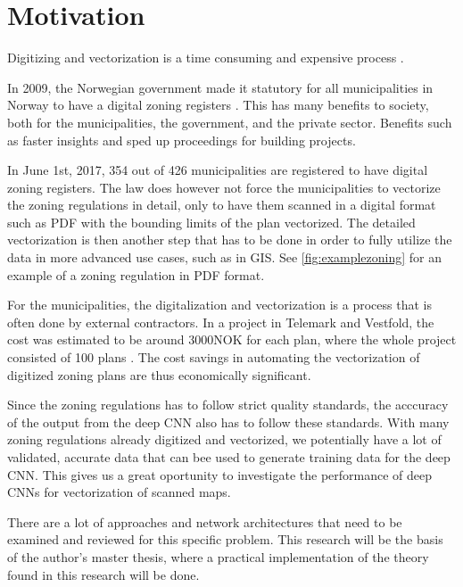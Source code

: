 \chapter{Motivation}\label{chp:motivation }
Digitizing and vectorization is a time consuming and expensive process \cite{Worboys2003}.

In 2009, the Norwegian government made it statutory for all municipalities in Norway to have a digital zoning registers \cite{Kommunaltplanregister2009}. This has many benefits to society, both for the municipalities, the government, and the private sector. Benefits such as faster insights and sped up proceedings for building projects. 

In June 1st, 2017, 354 out of 426 municipalities are registered to have digital zoning registers. The law does however not force the municipalities to vectorize the zoning regulations in detail, only to have them scanned in a digital format such as PDF with the bounding limits of the plan vectorized. The detailed vectorization is then another step that has to be done in order to fully utilize the data in more advanced use cases, such as in GIS. See \autoref{fig:examplezoning} for an example of a zoning regulation in PDF format.

For the municipalities, the digitalization and vectorization is a process that is often done by external contractors. In a project in Telemark and Vestfold, the cost was estimated to be around 3000NOK for each plan, where the whole project consisted of 100 plans \cite{Bo2009}. The cost savings in automating the vectorization of digitized zoning plans are thus economically significant. 

Since the zoning regulations has to follow strict quality standards, the acccuracy of the output from the deep CNN also has to follow these standards. With many zoning regulations already digitized and vectorized, we potentially have a lot of validated, accurate data that can bee used to generate training data for the deep CNN. This gives us a great oportunity to investigate the performance of deep CNNs for vectorization of scanned maps. 

There are a lot of approaches and network architectures that need to be examined and reviewed for this specific problem. This research will be the basis of the author's master thesis, where a practical implementation of the theory found in this research will be done. 


